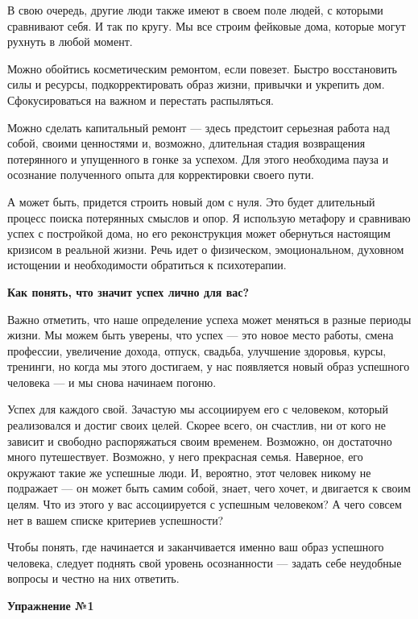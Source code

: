 \begin{fancyquotes}
    В свою очередь, другие люди также имеют в своем поле людей, с которыми сравнивают себя. И так по кругу. Мы все строим фейковые дома, которые могут рухнуть в любой момент.
\end{fancyquotes}

Можно обойтись косметическим ремонтом, если повезет. Быстро восстановить силы и ресурсы, подкорректировать образ жизни, привычки и укрепить дом. Сфокусироваться на важном и перестать распыляться.

Можно сделать капитальный ремонт — здесь предстоит серьезная работа над собой, своими ценностями и, возможно, длительная стадия возвращения потерянного и упущенного в гонке за успехом. Для этого необходима пауза и осознание полученного опыта для корректировки своего пути.

А может быть, придется строить новый дом с нуля. Это будет длительный процесс поиска потерянных смыслов и опор. Я использую метафору и сравниваю успех с постройкой дома, но его реконструкция может обернуться настоящим кризисом в реальной жизни. Речь идет о физическом, эмоциональном, духовном истощении и необходимости обратиться к психотерапии.

\textbf{Как понять, что значит успех лично для вас?}

Важно отметить, что наше определение успеха может меняться в разные периоды жизни. Мы можем быть уверены, что успех — это новое место работы, смена профессии, увеличение дохода, отпуск, свадьба, улучшение здоровья, курсы, тренинги, но когда мы этого достигаем, у нас появляется новый образ успешного человека — и мы снова начинаем погоню.

Успех для каждого свой. Зачастую мы ассоциируем его с человеком, который реализовался и достиг своих целей. Скорее всего, он счастлив, ни от кого не зависит и свободно распоряжаться своим временем. Возможно, он достаточно много путешествует. Возможно, у него прекрасная семья. Наверное, его окружают такие же успешные люди. И, вероятно, этот человек никому не подражает — он может быть самим собой, знает, чего хочет, и двигается к своим целям. Что из этого у вас ассоциируется с успешным человеком? А чего совсем нет в вашем списке критериев успешности?

Чтобы понять, где начинается и заканчивается именно ваш образ успешного человека, следует поднять свой уровень осознанности — задать себе неудобные вопросы и честно на них ответить.

\textbf{Упражнение №1}

